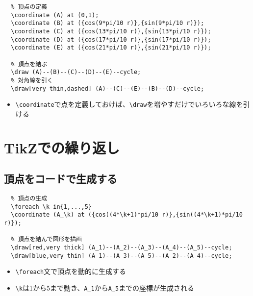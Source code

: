 \documentclass[16pt,b5paper]{article}
\begin{document}
\begin{lstlisting}
  % 頂点の定義
  \coordinate (A) at (0,1);
  \coordinate (B) at ({cos(9*pi/10 r)},{sin(9*pi/10 r)});
  \coordinate (C) at ({cos(13*pi/10 r)},{sin(13*pi/10 r)});
  \coordinate (D) at ({cos(17*pi/10 r)},{sin(17*pi/10 r)});
  \coordinate (E) at ({cos(21*pi/10 r)},{sin(21*pi/10 r)});

  % 頂点を結ぶ
  \draw (A)--(B)--(C)--(D)--(E)--cycle;
  % 対角線を引く
  \draw[very thin,dashed] (A)--(C)--(E)--(B)--(D)--cycle;
\end{lstlisting}

\begin{itemize}
  \item \verb|\coordinate|で点を定義しておけば、\verb|\draw|を増やすだけでいろいろな線を引ける
\end{itemize}

\section{TikZでの繰り返し}

\subsection{頂点をコードで生成する}


\begin{lstlisting}
  % 頂点の生成
  \foreach \k in{1,...,5}
  \coordinate (A_\k) at ({cos((4*\k+1)*pi/10 r)},{sin((4*\k+1)*pi/10 r)});

  % 頂点を結んで図形を描画
  \draw[red,very thick] (A_1)--(A_2)--(A_3)--(A_4)--(A_5)--cycle;
  \draw[blue,very thin] (A_1)--(A_3)--(A_5)--(A_2)--(A_4)--cycle;
\end{lstlisting}

\begin{itemize}
  \item \verb|\foreach|文で頂点を動的に生成する
  \item \verb|\k|は1から5まで動き、\verb|A_1|から\verb|A_5|までの座標が生成される
\end{itemize}
\end{document}
